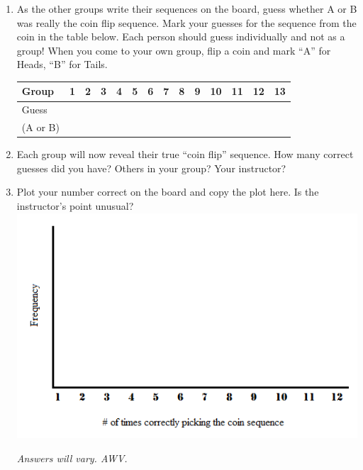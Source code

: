 \begin{enumerate}
  \item As the other groups write their sequences on the board, 
    guess whether A or B was really the coin flip sequence.  Mark
    your guesses for the sequence from the coin in the table below.
    Each person should guess individually and not as a group!  
    When you come to your own group, flip a coin and mark ``A'' for
    Heads, ``B'' for Tails.\\
    \hspace{-.4in}
    \begin{tabular}{|l|c|c|c|c|c|c|c|c|c|c|c|c|c|}
      \hline
      Group  &1   &  2  &  3  &  4  &  5  &  6  &  7  &  8  &  9  & 
      10 & 11 & 12 & 13\\
      \hline
      Guess  & \hspace{.2in} & \hspace{.2in}& \hspace{.2in}& \hspace{.2in}& \hspace{.2in}& \hspace{.2in}& \hspace{.2in}& \hspace{.2in}& \hspace{.2in}& \hspace{.2in}& \hspace{.2in}& \hspace{.2in}& \hspace{.2in}\\
(A or B)&&&&&&&&&&&&&\\
\hline
%
\hline
\end{tabular}


    \item Each group will now reveal their true ``coin flip''
      sequence.  How many correct guesses did you have? Others in your
      group?  Your instructor? \vspace{1in} 
    \item Plot your number correct on the board and copy the plot
      here. Is the instructor's point unusual?  \\
    \includegraphics[width=0.5\linewidth]{../plots/Act1-NullDist.png}
\begin{students}
  \vspace{1cm}
\end{students}    
\begin{key}
   {\it Answers will vary. AWV.}
\end{key}
 


\end{enumerate}
